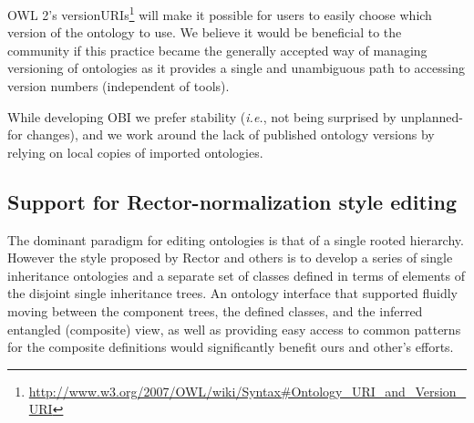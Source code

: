 \documentclass{elsart}       %
\begin{document}
OWL 2's versionURIs\footnote{\url{http://www.w3.org/2007/OWL/wiki/Syntax#Ontology_URI_and_Version_URI}} will make it possible for users to easily choose which version of the ontology to use.
We believe it would be beneficial to the community if this practice became the generally accepted way of managing versioning of ontologies as it provides a single and unambiguous path to accessing version numbers (independent of tools). 

While developing OBI we prefer stability (\emph{i.e.}, not being surprised by unplanned-for changes), and we work around the lack of published ontology versions by relying on local copies of imported ontologies.

\subsection{Support for Rector-normalization style editing}

The dominant paradigm for editing ontologies is that of a single rooted hierarchy.
However the style proposed by Rector and others is to develop a series of single inheritance ontologies and a separate set of classes defined in terms of elements of the disjoint single inheritance trees.
An ontology interface that supported fluidly moving between the component trees, the defined classes, and the inferred entangled (composite) view, as well as providing easy access to common patterns for the composite definitions would significantly benefit ours and other’s efforts.
\end{document}
